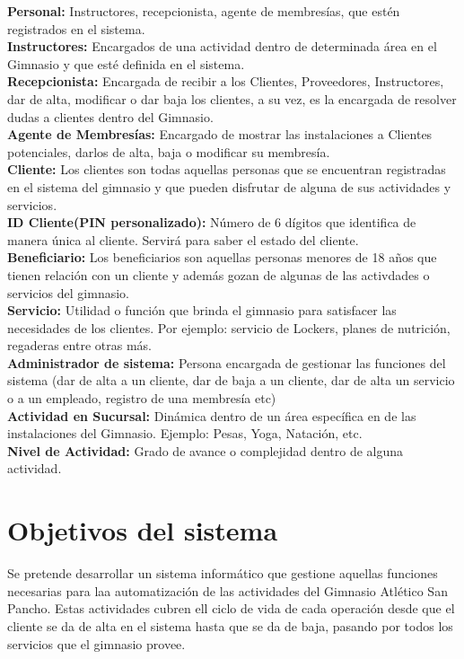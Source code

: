 \textbf{Personal:} Instructores, recepcionista, agente de membres\'ias, que est\'en registrados en el sistema.\\

\textbf{Instructores:} Encargados de una actividad dentro de determinada \'area en el Gimnasio y que est\'e definida en el sistema.\\

\textbf{Recepcionista: }Encargada de recibir a los Clientes, Proveedores, Instructores, dar de alta, modificar o dar baja los clientes, a su vez, es la encargada de resolver dudas a clientes dentro del Gimnasio.\\

\textbf{Agente de Membresías:} Encargado de mostrar las instalaciones a Clientes potenciales, darlos de alta, baja o modificar su membres\'ia.\\

\textbf{Cliente:} Los clientes son todas aquellas personas que se encuentran registradas en el sistema del gimnasio y que pueden disfrutar de alguna de sus actividades y servicios.\\

\textbf{ID Cliente(PIN personalizado):} Número  de 6 d\'igitos que identifica de manera \'unica al cliente. Servir\'a para saber el estado del cliente.\\

\textbf{Beneficiario:} Los beneficiarios son aquellas personas menores de 18 años que tienen relación con un cliente y además gozan de algunas de las activdades o servicios del gimnasio.\\

\textbf{Servicio: }Utilidad o funci\'on que brinda el gimnasio para satisfacer las necesidades de los clientes. Por ejemplo: servicio de Lockers, planes de nutrici\'on, regaderas entre otras m\'as.\\

\textbf{Administrador de sistema: }Persona encargada de gestionar las funciones del sistema (dar de alta a un cliente, dar de baja a un cliente, dar de alta un servicio o a un empleado, registro de una membres\'ia etc)\\

\textbf{Actividad en Sucursal: }Din\'amica dentro de un \'area espec\'ifica en de las instalaciones del Gimnasio. Ejemplo: Pesas, Yoga, Natación, etc.\\

\textbf{Nivel de Actividad:} Grado de avance o complejidad dentro de alguna actividad.

\section{Objetivos del sistema}
Se pretende desarrollar un sistema inform\'atico que gestione aquellas funciones necesarias para laa automatizaci\'on de las actividades del Gimnasio Atl\'etico San Pancho. Estas actividades cubren ell ciclo de vida de cada operaci\'on desde que el cliente se da de alta en el sistema hasta que se da de baja, pasando por todos los servicios que el gimnasio provee.
\clearedoublepage
